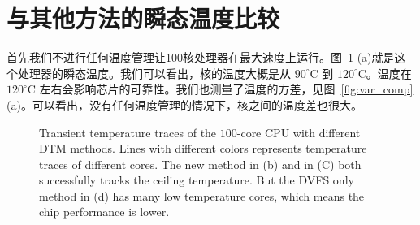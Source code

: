 \section{与其他方法的瞬态温度比较}\label{sec:temp_comp}
首先我们不进行任何温度管理让100核处理器在最大速度上运行。图~\ref{fig:temp} (a)就是这个处理器的瞬态温度。我们可以看出，核的温度大概是从 $90^{\circ}$C
到 $120^{\circ}$C。温度在 $120^{\circ}$C 左右会影响芯片的可靠性。我们也测量了温度的方差，见图~\ref{fig:var_comp} (a)。可以看出，没有任何温度管理的情况下，核之间的温度差也很大。

\begin{figure}[H]
  \centering

  \caption{Transient temperature traces of the $100$-core
    CPU with different DTM methods. Lines with different colors
    represents temperature traces of different cores. The new method
    in (b) and \cite{MaWang:APCCAS'14} in (C) both successfully tracks
    the ceiling temperature. But the DVFS only method in (d) has many
    low temperature cores, which means the chip performance is lower.}\label{fig:temp}
\end{figure}

